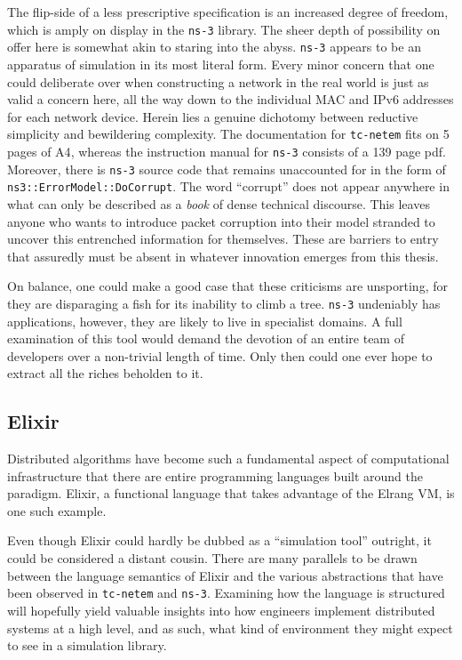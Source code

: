 The flip-side of a less prescriptive specification is an increased degree of freedom, which is amply on display in
the \texttt{ns-3} library. The sheer depth of possibility on offer here is somewhat akin to staring into the abyss.
\texttt{ns-3} appears to be an apparatus of simulation in its most literal form. Every minor concern that one could
deliberate over when constructing a network in the real world is just as valid a concern here, all the way down to
the individual MAC and IPv6 addresses for each network device. Herein lies a genuine dichotomy between reductive
simplicity and bewildering complexity. The documentation for \texttt{tc-netem} fits on 5 pages of
A4\cite{tc_netem_8_man}, whereas the instruction manual for \texttt{ns-3} consists of a 139 page pdf\cite{ns_3_man_pdf}.
Moreover, there is \texttt{ns-3} source code that remains unaccounted for in the form of
\texttt{ns3::ErrorModel::DoCorrupt}. The word ``corrupt'' does not appear anywhere in what can only be described as
a \emph{book} of dense technical discourse. This leaves anyone who wants to introduce packet corruption into their
model stranded to uncover this entrenched information for themselves. These are barriers to entry that assuredly must
be absent in whatever innovation emerges from this thesis.

On balance, one could make a good case that these criticisms are unsporting, for they are disparaging a fish for its
inability to climb a tree\cite{einstein_quotes}. \texttt{ns-3} undeniably has applications, however, they are likely
to live in specialist domains. A full examination of this tool would demand the devotion of an entire team of
developers over a non-trivial length of time. Only then could one ever hope to extract all the riches beholden to it.

\subsection{Elixir}

Distributed algorithms have become such a fundamental aspect of computational infrastructure that there are entire
programming languages built around the paradigm. Elixir, a functional language that takes advantage of the Elrang VM,
is one such example\cite{elixir, erlang}.

Even though Elixir could hardly be dubbed as a ``simulation tool'' outright, it could be considered a distant cousin.
There are many parallels to be drawn between the language semantics of Elixir and the various abstractions that
have been observed in \texttt{tc-netem} and \texttt{ns-3}. Examining how the language is structured will hopefully
yield valuable insights into how engineers implement distributed systems at a high level, and as such, what kind of
environment they might expect to see in a simulation library.

